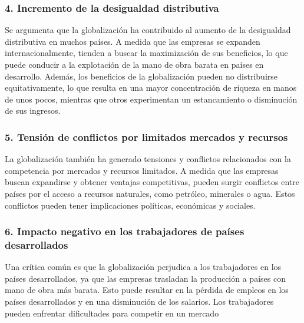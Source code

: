 \documentclass[
  a4paper,
]{article}
\begin{document}
\hypertarget{incremento-de-la-desigualdad-distributiva}{%
\subsubsection{4. Incremento de la desigualdad
distributiva}\label{incremento-de-la-desigualdad-distributiva}}

Se argumenta que la globalización ha contribuido al aumento de la
desigualdad distributiva en muchos países. A medida que las empresas se
expanden internacionalmente, tienden a buscar la maximización de sus
beneficios, lo que puede conducir a la explotación de la mano de obra
barata en países en desarrollo. Además, los beneficios de la
globalización pueden no distribuirse equitativamente, lo que resulta en
una mayor concentración de riqueza en manos de unos pocos, mientras que
otros experimentan un estancamiento o disminución de sus ingresos.

\hypertarget{tensiuxf3n-de-conflictos-por-limitados-mercados-y-recursos}{%
\subsubsection{5. Tensión de conflictos por limitados mercados y
recursos}\label{tensiuxf3n-de-conflictos-por-limitados-mercados-y-recursos}}

La globalización también ha generado tensiones y conflictos relacionados
con la competencia por mercados y recursos limitados. A medida que las
empresas buscan expandirse y obtener ventajas competitivas, pueden
surgir conflictos entre países por el acceso a recursos naturales, como
petróleo, minerales o agua. Estos conflictos pueden tener implicaciones
políticas, económicas y sociales.

\hypertarget{impacto-negativo-en-los-trabajadores-de-pauxedses-desarrollados}{%
\subsubsection{6. Impacto negativo en los trabajadores de países
desarrollados}\label{impacto-negativo-en-los-trabajadores-de-pauxedses-desarrollados}}

Una crítica común es que la globalización perjudica a los trabajadores
en los países desarrollados, ya que las empresas trasladan la producción
a países con mano de obra más barata. Esto puede resultar en la pérdida
de empleos en los países desarrollados y en una disminución de los
salarios. Los trabajadores pueden enfrentar dificultades para competir
en un mercado
\end{document}
